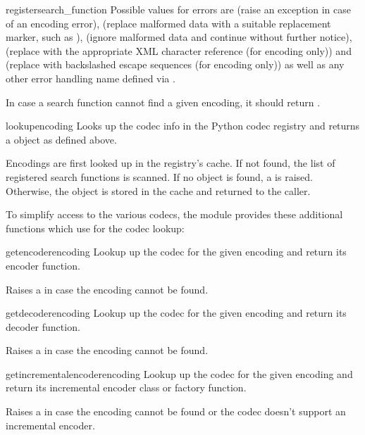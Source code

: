 \begin{funcdesc}{register}{search_function}
  Possible values for errors are  (raise an exception
  in case of an encoding error),  (replace malformed
  data with a suitable replacement marker, such as ),
   (ignore malformed data and continue without further
  notice),  (replace with the appropriate XML
  character reference (for encoding only)) and 
  (replace with backslashed escape sequences (for encoding only)) as
  well as any other error handling name defined via
  .

In case a search function cannot find a given encoding, it should
return .
\end{funcdesc}

\begin{funcdesc}{lookup}{encoding}
Looks up the codec info in the Python codec registry and returns a
 object as defined above.

Encodings are first looked up in the registry's cache. If not found,
the list of registered search functions is scanned. If no 
object is found, a  is raised. Otherwise, the
 object is stored in the cache and returned to the caller.
\end{funcdesc}

To simplify access to the various codecs, the module provides these
additional functions which use  for the codec
lookup:

\begin{funcdesc}{getencoder}{encoding}
Lookup up the codec for the given encoding and return its encoder
function.

Raises a  in case the encoding cannot be found.
\end{funcdesc}

\begin{funcdesc}{getdecoder}{encoding}
Lookup up the codec for the given encoding and return its decoder
function.

Raises a  in case the encoding cannot be found.
\end{funcdesc}

\begin{funcdesc}{getincrementalencoder}{encoding}
Lookup up the codec for the given encoding and return its incremental encoder
class or factory function.

Raises a  in case the encoding cannot be found or the
codec doesn't support an incremental encoder.
\end{funcdesc}


